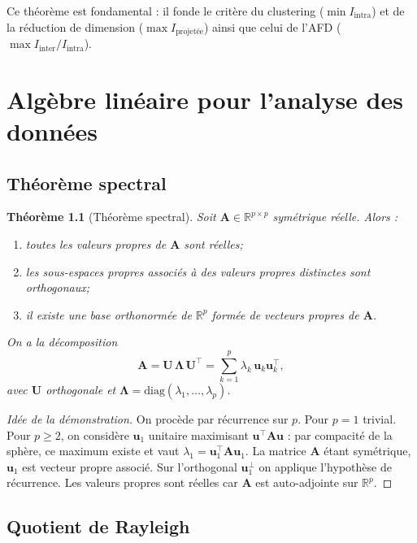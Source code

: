 \documentclass[11pt, a4paper, openany]{book}
\theoremstyle{plain}
\newtheorem{theorem}{Théorème}[chapter]
\theoremstyle{definition}
\theoremstyle{remark}
\newcommand{\R}{\mathbb{R}}
\newcommand{\1}{\mathds{1}}
\newcommand{\U}{\mathbf{U}}
\newcommand{\bLambda}{\mathbf{\Lambda}}
\begin{document}
Ce théorème est fondamental : il fonde le critère du clustering
($\min I_{\text{intra}}$) et de la réduction de dimension
($\max I_{\text{projetée}}$) ainsi que celui de l'AFD
($\max I_{\text{inter}} / I_{\text{intra}}$).

\chapter{Algèbre linéaire pour l'analyse des données}

\section{Théorème spectral}

\begin{theorem}[Théorème spectral]
Soit $\mathbf{A} \in \R^{p \times p}$ symétrique réelle. Alors :
\begin{enumerate}
  \item toutes les valeurs propres de $\mathbf{A}$ sont réelles;
  \item les sous-espaces propres associés à des valeurs propres distinctes sont orthogonaux;
  \item il existe une base orthonormée de $\R^p$ formée de vecteurs propres de $\mathbf{A}$.
\end{enumerate}
On a la décomposition
\[
\mathbf{A} = \U\, \bLambda\, \U^\top = \sum_{k=1}^p \lambda_k\, \mathbf{u}_k \mathbf{u}_k^\top,
\]
avec $\U$ orthogonale et $\bLambda = \mathrm{diag}(\lambda_1, \ldots, \lambda_p)$.
\end{theorem}

\begin{proof}[Idée de la démonstration]
On procède par récurrence sur $p$. Pour $p=1$ trivial. Pour $p \geq 2$, on
considère $\mathbf{u}_1$ unitaire maximisant $\mathbf{u}^\top \mathbf{A} \mathbf{u}$ : par compacité
de la sphère, ce maximum existe et vaut $\lambda_1 = \mathbf{u}_1^\top \mathbf{A} \mathbf{u}_1$.
La matrice $\mathbf{A}$ étant symétrique, $\mathbf{u}_1$ est vecteur propre associé.
Sur l'orthogonal $\mathbf{u}_1^\perp$ on applique l'hypothèse de récurrence.
Les valeurs propres sont réelles car $\mathbf{A}$ est auto-adjointe sur $\R^p$.
\end{proof}

\section{Quotient de Rayleigh}
\end{document}
